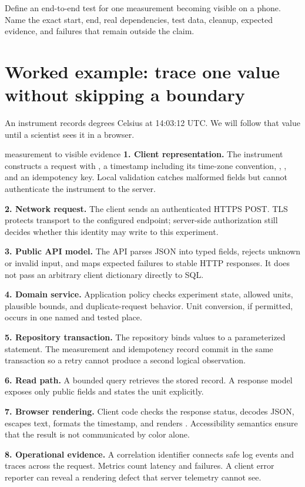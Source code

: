 \begin{checkpointbox}
Define an end-to-end test for one measurement becoming visible on a phone. Name
the exact start, end, real dependencies, test data, cleanup, expected evidence,
and failures that remain outside the claim.
\end{checkpointbox}

\section{Worked example: trace one value without skipping a boundary}

An instrument records  degrees Celsius at 14:03:12 UTC. We will
follow that value until a scientist sees it in a browser.

\begin{workedexample}{measurement to visible evidence}
\textbf{1. Client representation.} The instrument constructs a request with
, a timestamp including its time-zone convention,
, , and an idempotency key. Local validation
catches malformed fields but cannot authenticate the instrument to the server.

\textbf{2. Network request.} The client sends an authenticated HTTPS POST. TLS
protects transport to the configured endpoint; server-side authorization still
decides whether this identity may write to this experiment.

\textbf{3. Public API model.} The API parses JSON into typed fields, rejects
unknown or invalid input, and maps expected failures to stable HTTP responses.
It does not pass an arbitrary client dictionary directly to SQL.

\textbf{4. Domain service.} Application policy checks experiment state, allowed
units, plausible bounds, and duplicate-request behavior. Unit conversion, if
permitted, occurs in one named and tested place.

\textbf{5. Repository transaction.} The repository binds values to a
parameterized statement. The measurement and idempotency record commit in the
same transaction so a retry cannot produce a second logical observation.

\textbf{6. Read path.} A bounded query retrieves the stored record. A response
model exposes only public fields and states the unit explicitly.

\textbf{7. Browser rendering.} Client code checks the response status, decodes
JSON, escapes text, formats the timestamp, and renders .
Accessibility semantics ensure that the result is not communicated by color
alone.

\textbf{8. Operational evidence.} A correlation identifier connects safe log
events and traces across the request. Metrics count latency and failures. A
client error reporter can reveal a rendering defect that server telemetry
cannot see.
\end{workedexample}

